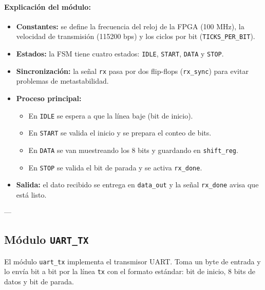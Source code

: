 \documentclass[a4paper,12pt]{article}
\begin{document}
\paragraph{Explicación del módulo:}
\begin{itemize}
    \item \textbf{Constantes:} se define la frecuencia del reloj de la FPGA (100 MHz), la velocidad de transmisión (115200 bps) y los ciclos por bit (\texttt{TICKS\_PER\_BIT}).
    \item \textbf{Estados:} la FSM tiene cuatro estados: \texttt{IDLE}, \texttt{START}, \texttt{DATA} y \texttt{STOP}.
    \item \textbf{Sincronización:} la señal \texttt{rx} pasa por dos flip-flops (\texttt{rx\_sync}) para evitar problemas de metastabilidad.
    \item \textbf{Proceso principal:} 
    \begin{itemize}
        \item En \texttt{IDLE} se espera a que la línea baje (bit de inicio).
        \item En \texttt{START} se valida el inicio y se prepara el conteo de bits.
        \item En \texttt{DATA} se van muestreando los 8 bits y guardando en \texttt{shift\_reg}.
        \item En \texttt{STOP} se valida el bit de parada y se activa \texttt{rx\_done}.
    \end{itemize}
    \item \textbf{Salida:} el dato recibido se entrega en \texttt{data\_out} y la señal \texttt{rx\_done} avisa que está listo.
\end{itemize}

---

\subsection{Módulo \texttt{UART\_TX}}

El módulo \texttt{uart\_tx} implementa el transmisor UART. Toma un byte de entrada y lo envía bit a bit por la línea \texttt{tx} con el formato estándar: bit de inicio, 8 bits de datos y bit de parada.
\end{document}
